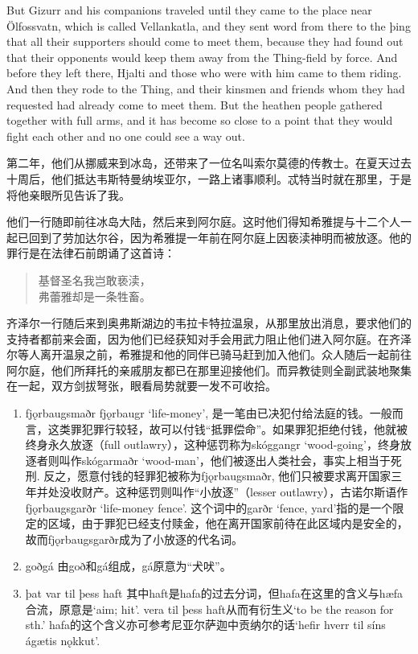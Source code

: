 \begin{paracol}{2}
    \switchcolumn

    But Gizurr and his companions traveled until they came to the place near Ölfossvatn, which is called Vellankatla, and they sent word from there to the þing that all their supporters should come to meet them, because they had found out that their opponents would keep them away from the Thing-field by force. And before they left there, Hjalti and those who were with him came to them riding. And then they rode to the Thing, and their kinsmen and friends whom they had requested had already come to meet them. But the heathen people gathered together with full arms, and it has become so close to a point that they would fight each other and no one could see a way out.
\end{paracol}


\begin{translation*}{}
    第二年，他们从挪威来到冰岛，还带来了一位名叫索尔莫德的传教士。在夏天过去十周后，他们抵达韦斯特曼纳埃亚尔，一路上诸事顺利。忒特当时就在那里，于是将他亲眼所见告诉了我。

    他们一行随即前往冰岛大陆，然后来到阿尔庭。这时他们得知希雅提与十二个人一起已回到了劳加达尔谷，因为希雅提一年前在阿尔庭上因亵渎神明而被放逐。他的罪行是在法律石前朗诵了这首诗：
    \begin{quote}
        基督圣名我岂敢亵渎，\\
        弗蕾雅却是一条牲畜。
    \end{quote}

    齐泽尔一行随后来到奥弗斯湖边的韦拉卡特拉温泉，从那里放出消息，要求他们的支持者都前来会面，因为他们已经获知对手会用武力阻止他们进入阿尔庭。在齐泽尔等人离开温泉之前，希雅提和他的同伴已骑马赶到加入他们。众人随后一起前往阿尔庭，他们所拜托的亲戚朋友都已在那里迎接他们。而异教徒则全副武装地聚集在一起，双方剑拔弩张，眼看局势就要一发不可收拾。
\end{translation*}
\begin{grammar*}{}
    \begin{enumerate}[leftmargin=*]
        \item fjǫrbaugsmaðr
              fjǫrbaugr `life-money', 是一笔由已决犯付给法庭的钱。一般而言，这类罪犯罪行较轻，故可以付钱“抵罪偿命”。如果罪犯拒绝付钱，他就被终身永久放逐（full outlawry），这种惩罚称为skóggangr `wood-going'，终身放逐者则叫作skógarmaðr `wood-man'，他们被逐出人类社会，事实上相当于死刑. 反之，愿意付钱的轻罪犯被称为fjǫrbaugsmaðr, 他们只被要求离开国家三年并处没收财产。这种惩罚则叫作“小放逐”（lesser outlawry），古诺尔斯语作fjǫrbaugsgarðr `life-money fence'. 这个词中的garðr `fence, yard'指的是一个限定的区域，由于罪犯已经支付赎金，他在离开国家前待在此区域内是安全的，故而fjǫrbaugsgarðr成为了小放逐的代名词。
        \item goðgá
              由goð和gá组成，gá原意为“犬吠”。

        \item þat var til þess haft
              其中haft是hafa的过去分词，但hafa在这里的含义与hæfa合流，原意是`aim; hit'. vera til þess haft从而有衍生义`to be the reason for sth.' hafa的这个含义亦可参考尼亚尔萨迦中贡纳尔的话`hefir hverr til síns ágætis nǫkkut'.
    \end{enumerate}
\end{grammar*}
